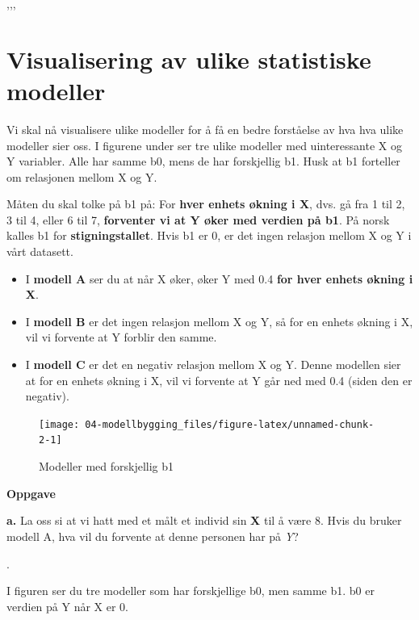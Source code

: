 \documentclass[
]{book}
\begin{document}
,,,

\hypertarget{visualisering-av-ulike-statistiske-modeller}{%
\section{Visualisering av ulike statistiske modeller}\label{visualisering-av-ulike-statistiske-modeller}}

Vi skal nå visualisere ulike modeller for å få en bedre forståelse av hva hva ulike modeller sier oss. I figurene under ser tre ulike modeller med uinteressante X og Y variabler. Alle har samme b0, mens de har forskjellig b1. Husk at b1 forteller om relasjonen mellom X og Y.

Måten du skal tolke på b1 på: For \textbf{hver enhets økning i X}, dvs. gå fra 1 til 2, 3 til 4, eller 6 til 7, \textbf{forventer vi at Y øker med verdien på b1}. På norsk kalles b1 for \textbf{stigningstallet}. Hvis b1 er 0, er det ingen relasjon mellom X og Y i vårt datasett.

\begin{itemize}
\item
  I \textbf{modell A} ser du at når X øker, øker Y med 0.4 \textbf{for hver enhets økning i X}.
\item
  I \textbf{modell B} er det ingen relasjon mellom X og Y, så for en enhets økning i X, vil vi forvente at Y forblir den samme.
\item
  I \textbf{modell C} er det en negativ relasjon mellom X og Y. Denne modellen sier at for en enhets økning i X, vil vi forvente at Y går ned med 0.4 (siden den er negativ).
\end{itemize}

\begin{figure}

{\centering \texttt{[image: 04-modellbygging\_files/figure-latex/unnamed-chunk-2-1]} 

}

\caption{Modeller med forskjellig b1}\label{fig:unnamed-chunk-2}
\end{figure}

\textbf{Oppgave}

\textbf{a.} La oss si at vi hatt med et målt et individ sin \textbf{X} til å være 8. Hvis du bruker modell A, hva vil du forvente at denne personen har på \emph{Y}?

.

I figuren ser du tre modeller som har forskjellige b0, men samme b1. b0 er verdien på Y når X er 0.
\end{document}
